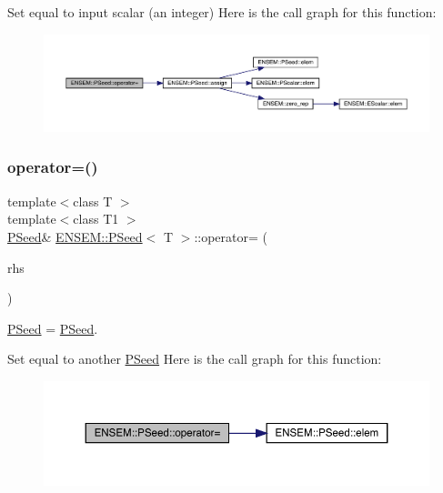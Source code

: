 Set equal to input scalar (an integer) Here is the call graph for this function\+:
\nopagebreak
\begin{figure}[H]
\begin{center}
\leavevmode
\includegraphics[width=350pt]{dc/d14/classENSEM_1_1PSeed_aa7d9ec1f6a7cca8ee109c29d75482350_cgraph}
\end{center}
\end{figure}
\mbox{\label{classENSEM_1_1PSeed_a22c88645227bfddbfea703ed71117795}} 
\subsubsection{\texorpdfstring{operator=()}{operator=()}\hspace{0.1cm}{\footnotesize\ttfamily [4/6]}}
{\footnotesize\ttfamily template$<$class T $>$ \\
template$<$class T1 $>$ \\
\mbox{\hyperlink{classENSEM_1_1PSeed}{P\+Seed}}\& \mbox{\hyperlink{classENSEM_1_1PSeed}{E\+N\+S\+E\+M\+::\+P\+Seed}}$<$ T $>$\+::operator= (\begin{DoxyParamCaption}\item[{const \mbox{\hyperlink{classENSEM_1_1PSeed}{P\+Seed}}$<$ T1 $>$ \&}]{rhs }\end{DoxyParamCaption})\hspace{0.3cm}{\ttfamily [inline]}}



\mbox{\hyperlink{classENSEM_1_1PSeed}{P\+Seed}} = \mbox{\hyperlink{classENSEM_1_1PSeed}{P\+Seed}}. 

Set equal to another \mbox{\hyperlink{classENSEM_1_1PSeed}{P\+Seed}} Here is the call graph for this function\+:
\nopagebreak
\begin{figure}[H]
\begin{center}
\leavevmode
\includegraphics[width=350pt]{dc/d14/classENSEM_1_1PSeed_a22c88645227bfddbfea703ed71117795_cgraph}
\end{center}
\end{figure}
\mbox{\label{classENSEM_1_1PSeed_a22c88645227bfddbfea703ed71117795}} 
